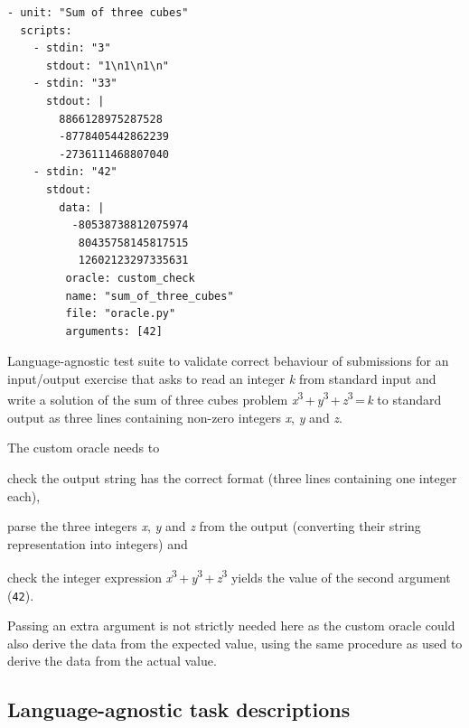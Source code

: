 \documentclass[../main]{subfiles}
\begin{document}
\begin{listing}
    \begin{verbatim}
- unit: "Sum of three cubes"
  scripts:
    - stdin: "3"
      stdout: "1\n1\n1\n"
    - stdin: "33"
      stdout: |
        8866128975287528
        -8778405442862239
        -2736111468807040
    - stdin: "42"
      stdout:
        data: |
          -80538738812075974
           80435758145817515
           12602123297335631
         oracle: custom_check
         name: "sum_of_three_cubes"
         file: "oracle.py"
         arguments: [42]
    \end{verbatim}
    \caption[]{
        Language-agnostic test suite to validate correct behaviour of submissions for an input/output exercise that asks to read an integer \textit{k} from standard input and write a solution of the sum of three cubes problem {\textit{x}\textsuperscript{3}\,+\,\textit{y}\textsuperscript{3}\,+\,\textit{z}\textsuperscript{3}\,=\,\textit{k}} to standard output as three lines containing non-zero integers \textit{x}, \textit{y} and \textit{z}.
    }
    \label{lst:sum-example}
\end{listing}

The custom oracle needs to
\begin{enumerate*}[label=\emph{\roman*})]
    \item check the output string has the correct format (three lines containing one integer each),
    \item parse the three integers \textit{x}, \textit{y} and \textit{z} from the output (converting their string representation into integers) and
    \item check the integer expression {\textit{x}\textsuperscript{3}\,+\,\textit{y}\textsuperscript{3}\,+\,\textit{z}\textsuperscript{3}} yields the value of the second argument (\texttt{42}).
\end{enumerate*}
Passing an extra argument is not strictly needed here as the custom oracle could also derive the data from the expected value, using the same procedure as used to derive the data from the actual value.

\subsection{Language-agnostic task descriptions}\label{subsec:example-language-agnostic-task-descriptions}
\end{document}
